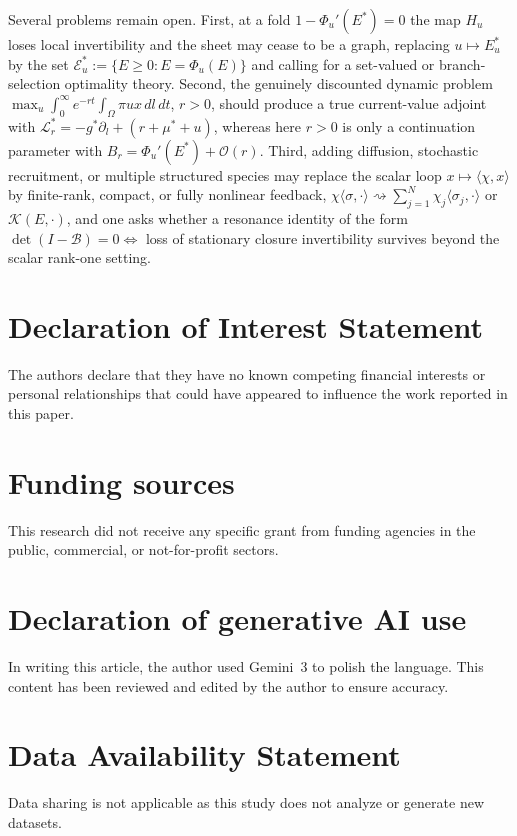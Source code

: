 \documentclass[a4paper,fleqn,longmktitle]{cas-sc}
\theoremstyle{plain}
\theoremstyle{definition}
\theoremstyle{remark}
\numberwithin{equation}{section}
\begin{document}
Several problems remain open. First, at a fold \(1-\Phi_u'(E^*)=0\) the map
\(H_u\) loses local invertibility and the sheet may cease to be a graph,
replacing \(u\mapsto E_u^*\) by the set
\(\mathcal E_u^*:=\{E\ge0:E=\Phi_u(E)\}\) and calling for a set-valued or
branch-selection optimality theory. Second, the genuinely discounted dynamic
problem \(\max_u\int_0^\infty e^{-rt}\int_\Omega\pi u x\,dl\,dt\), \(r>0\),
should produce a true current-value adjoint with
\(\mathcal L_r^*=-g^*\partial_l+(r+\mu^*+u)\), whereas here \(r>0\) is only a
continuation parameter with \(B_r=\Phi_u'(E^*)+\mathcal O(r)\). Third, adding diffusion,
stochastic recruitment, or multiple structured species may replace the scalar
loop \(x\mapsto\langle\chi,x\rangle\) by finite-rank, compact, or fully
nonlinear feedback,
\(\chi\langle\sigma,\cdot\rangle\rightsquigarrow\sum_{j=1}^N\chi_j\langle\sigma_j,\cdot\rangle\)
or \(\mathcal K(E,\cdot)\), and one asks whether a resonance identity of the
form \(\det(I-\mathcal B)=0\iff\) loss of stationary closure invertibility
survives beyond the scalar rank-one setting.

\section*{Declaration of Interest Statement}
The authors declare that they have no known competing financial interests or personal relationships that could have appeared to influence the work reported in this paper.

\section*{Funding sources}
This research did not receive any specific grant from funding agencies in the public, commercial, or not-for-profit sectors.

\section*{Declaration of generative AI use}
In writing this article, the author used Gemini~3 to polish the language. This content has been reviewed and edited by the author to ensure accuracy.

\section*{Data Availability Statement}
Data sharing is not applicable as this study does not analyze or generate new datasets.
\end{document}
